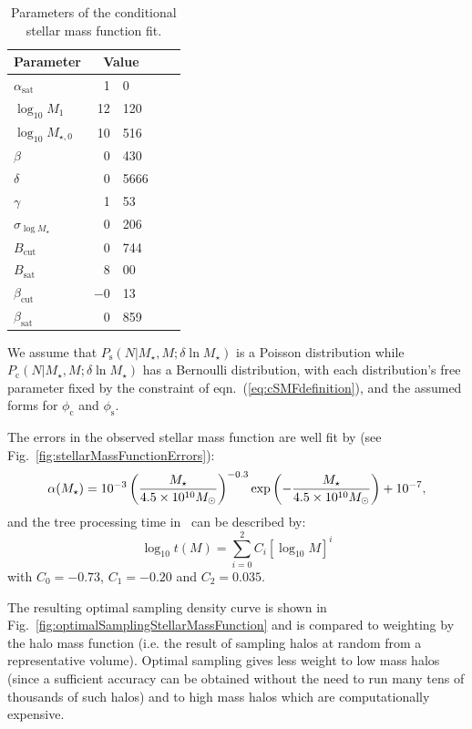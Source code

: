 \begin{table}
\begin{center}
\caption{Parameters of the conditional stellar mass function fit.}
\label{tb:z0SMFFitParameters}
\begin{tabular}{lr@{.}lr@{.}l}
\hline
{\normalfont \bfseries Parameter} & \multicolumn{2}{c}{\normalfont \bfseries Value} \\
\hline
$\alpha_\mathrm{sat}$& 1&0 \\
$\log_{10} M_1$& 12&120 \\
$\log_{10} M_{\star,0}$& 10&516 \\
$\beta$& 0&430 \\
$\delta$& 0&5666 \\
$\gamma$& 1&53 \\
$\sigma_{\log M_\star}$& 0&206 \\
$B_\mathrm{cut}$& 0&744 \\
$B_\mathrm{sat}$& 8&00 \\
$\beta_\mathrm{cut}$& $-$0&13 \\
$\beta_\mathrm{sat}$& 0&859 \\
\hline
\end{tabular}
\end{center}
\end{table}

We assume that $P_\mathrm{s}(N|M_\star,M;\delta \ln M_\star)$ is a Poisson distribution while $P_\mathrm{c}(N|M_\star,M;\delta \ln M_\star)$ has a Bernoulli distribution, with each distribution's free parameter fixed by the constraint of eqn.~(\ref{eq:cSMFdefinition}), and the assumed forms for $\phi_\mathrm{c}$ and $\phi_\mathrm{s}$.

The errors in the \cite{li_distribution_2009} observed stellar mass function are well fit by (see Fig.~\ref{fig:stellarMassFunctionErrors}):
\begin{equation}
 \alpha(M_\star) = 10^{-3} \left({M_\star\over 4.5\times 10^{10}M_\odot}\right)^{-0.3} \exp\left(-{M_\star\over 4.5\times 10^{10}M_\odot}\right) + 10^{-7},
 \label{eq:stellarMassFunctionErrorsFit}
\end{equation}
and the tree processing time in \glc\ can be described by:
\begin{equation}
 \log_{10} t(M) = \sum_{i=0}^2 C_i [ \log_{10} M ]^i
\end{equation}
with $C_0=-0.73$, $C_1=-0.20$ and $C_2=0.035$.

The resulting optimal sampling density curve is shown in Fig.~\ref{fig:optimalSamplingStellarMassFunction} and is compared to weighting by the halo mass function (i.e. the result of sampling halos at random from a representative volume). Optimal sampling gives less weight to low mass halos (since a sufficient accuracy can be obtained without the need to run many tens of thousands of such halos) and to high mass halos which are computationally expensive. 


